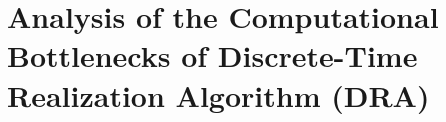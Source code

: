 
\section{Analysis of the Computational  Bottlenecks of Discrete-Time Realization
Algorithm (DRA)}


